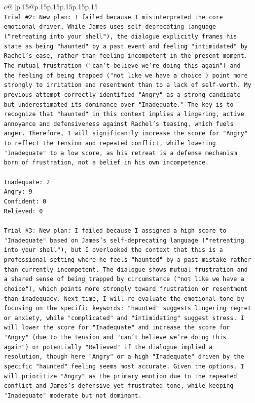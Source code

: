 \documentclass{article}
\begin{document}
{\begin{supertabular}{c@{$\;$}|p{.15\linewidth}@{}p{.15\linewidth}p{.15\linewidth}p{.15\linewidth}p{.15\linewidth}p{.15\linewidth}}
{{{\\ 
\texttt{Trial \#2: New plan: I failed because I misinterpreted the core emotional driver. While James uses self{-}deprecating language ("retreating into your shell"), the dialogue explicitly frames his state as being "haunted" by a past event and feeling "intimidated" by Rachel's ease, rather than feeling incompetent in the present moment. The mutual frustration ("can't believe we're doing this again") and the feeling of being trapped ("not like we have a choice") point more strongly to irritation and resentment than to a lack of self{-}worth. My previous attempt correctly identified "Angry" as a strong candidate but underestimated its dominance over "Inadequate." The key is to recognize that "haunted" in this context implies a lingering, active annoyance and defensiveness against Rachel's teasing, which fuels anger. Therefore, I will significantly increase the score for "Angry" to reflect the tension and repeated conflict, while lowering "Inadequate" to a low score, as his retreat is a defense mechanism born of frustration, not a belief in his own incompetence.} \\
\\ 
\texttt{Inadequate: 2} \\
\texttt{Angry: 9} \\
\texttt{Confident: 0} \\
\texttt{Relieved: 0} \\
\\ 
\texttt{Trial \#3: New plan: I failed because I assigned a high score to "Inadequate" based on James's self{-}deprecating language ("retreating into your shell"), but I overlooked the context that this is a professional setting where he feels "haunted" by a past mistake rather than currently incompetent. The dialogue shows mutual frustration and a shared sense of being trapped by circumstance ("not like we have a choice"), which points more strongly toward frustration or resentment than inadequacy. Next time, I will re{-}evaluate the emotional tone by focusing on the specific keywords: "haunted" suggests lingering regret or anxiety, while "complicated" and "intimidating" suggest stress. I will lower the score for "Inadequate" and increase the score for "Angry" (due to the tension and "can't believe we're doing this again") or potentially "Relieved" if the dialogue implied a resolution, though here "Angry" or a high "Inadequate" driven by the specific "haunted" feeling seems most accurate. Given the options, I will prioritize "Angry" as the primary emotion due to the repeated conflict and James's defensive yet frustrated tone, while keeping "Inadequate" moderate but not dominant.} \\
}}}
\end{supertabular}}
\end{document}
